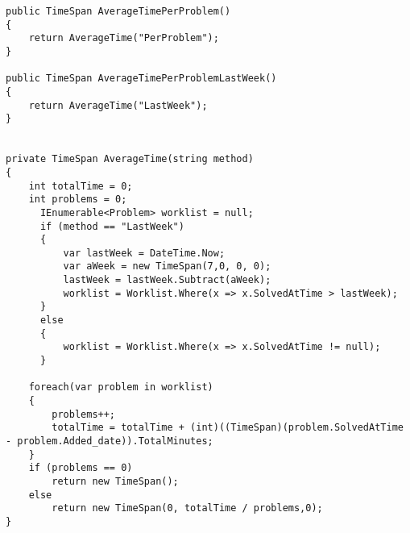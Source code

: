 \begin{lstlisting}[style=sourceCode, caption=\myCaption{The AverageTime(string method) method -- which is found in the \cl{Person} class -- together with its wrapper.}, label=lst:averagetime]
public TimeSpan AverageTimePerProblem()
{
    return AverageTime("PerProblem");
}

public TimeSpan AverageTimePerProblemLastWeek()
{
    return AverageTime("LastWeek");
}


private TimeSpan AverageTime(string method)
{
    int totalTime = 0;
    int problems = 0;
      IEnumerable<Problem> worklist = null;
      if (method == "LastWeek")
      {
          var lastWeek = DateTime.Now;
          var aWeek = new TimeSpan(7,0, 0, 0);
          lastWeek = lastWeek.Subtract(aWeek);
          worklist = Worklist.Where(x => x.SolvedAtTime > lastWeek);
      }
      else
      {
          worklist = Worklist.Where(x => x.SolvedAtTime != null);
      }

    foreach(var problem in worklist)
    {
        problems++;
        totalTime = totalTime + (int)((TimeSpan)(problem.SolvedAtTime - problem.Added_date)).TotalMinutes;
    }
    if (problems == 0)
        return new TimeSpan();
    else 
        return new TimeSpan(0, totalTime / problems,0);
}
\end{lstlisting}